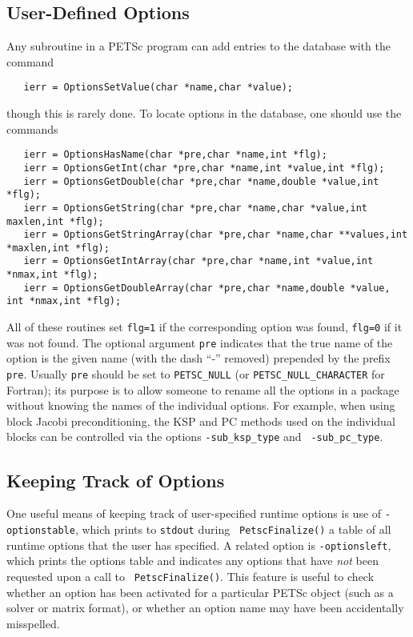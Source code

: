 \subsection{User-Defined Options}

Any subroutine in a PETSc program can add entries to the database with the 
command 
\begin{verbatim}
   ierr = OptionsSetValue(char *name,char *value);
\end{verbatim}
though this is rarely done.
To locate options in the database, one should use the
commands  
\begin{verbatim}
   ierr = OptionsHasName(char *pre,char *name,int *flg);
   ierr = OptionsGetInt(char *pre,char *name,int *value,int *flg);
   ierr = OptionsGetDouble(char *pre,char *name,double *value,int *flg);
   ierr = OptionsGetString(char *pre,char *name,char *value,int maxlen,int *flg);
   ierr = OptionsGetStringArray(char *pre,char *name,char **values,int *maxlen,int *flg);
   ierr = OptionsGetIntArray(char *pre,char *name,int *value,int *nmax,int *flg);
   ierr = OptionsGetDoubleArray(char *pre,char *name,double *value, int *nmax,int *flg);
\end{verbatim}
All 
of  
these 
routines set {\tt flg=1} if the corresponding option was found, {\tt flg=0} if it
was not found.  The optional argument
{\tt pre} indicates that the true name of the option is the given name
(with the dash ``-'' removed) prepended by the prefix {\tt pre}.
Usually {\tt pre} should be set to {\tt PETSC\_NULL} (or {\tt PETSC\_NULL\_CHARACTER}
for Fortran); its purpose is to
allow someone to rename all the options in a package without knowing
the names of the individual options.  For example, when using block
Jacobi preconditioning, the KSP and PC methods used on the individual
blocks can be controlled via the options {\tt -sub\_ksp\_type} and {\tt
-sub\_pc\_type}. 

\subsection{Keeping Track of Options}

One useful means of keeping track of user-specified runtime options is
use of {\tt -optionstable}, which prints to {\tt stdout} during {\tt
PetscFinalize()} a table of all runtime options that the user has
specified.   A related option is {\tt -optionsleft},
 which prints the options table and indicates
any options that have {\em not} been requested upon a call to {\tt
PetscFinalize()}.  This feature is useful to check whether an option
has been activated for a particular PETSc object (such as a solver or
matrix format), or whether an option name may have been accidentally
misspelled.


